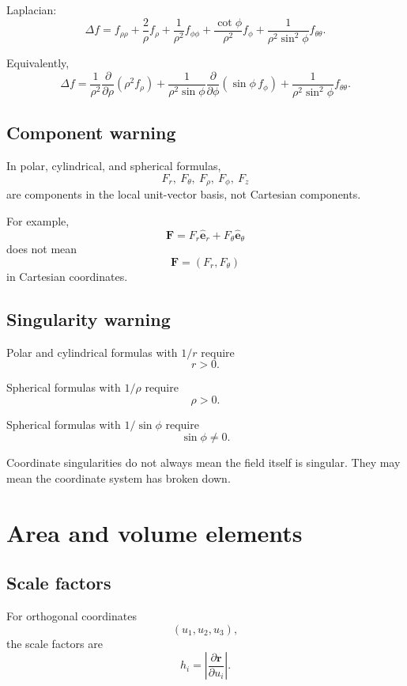 Laplacian:
\[
\boxed{
    \Delta f
    =
    f_{\rho\rho}
    +
    \frac2\rho f_\rho
    +
    \frac1{\rho^2}f_{\phi\phi}
    +
    \frac{\cot\phi}{\rho^2}f_\phi
    +
    \frac1{\rho^2\sin^2\phi}f_{\theta\theta}.
}
\]

Equivalently,
\[
\boxed{
    \Delta f
    =
    \frac1{\rho^2}\frac{\partial}{\partial\rho}
    \left(\rho^2 f_\rho\right)
    +
    \frac1{\rho^2\sin\phi}
    \frac{\partial}{\partial\phi}
    \left(\sin\phi\,f_\phi\right)
    +
    \frac1{\rho^2\sin^2\phi}f_{\theta\theta}.
}
\]

\subsection*{Component warning}

In polar, cylindrical, and spherical formulas,
\[
    F_r,\ F_\theta,\ F_\rho,\ F_\phi,\ F_z
\]
are components in the local unit-vector basis, not Cartesian components.

For example,
\[
    \mathbf F=F_r\widehat{\mathbf e}_r+F_\theta\widehat{\mathbf e}_\theta
\]
does not mean
\[
    \mathbf F=(F_r,F_\theta)
\]
in Cartesian coordinates.

\subsection*{Singularity warning}

Polar and cylindrical formulas with \(1/r\) require
\[
    r>0.
\]

Spherical formulas with \(1/\rho\) require
\[
    \rho>0.
\]

Spherical formulas with \(1/\sin\phi\) require
\[
    \sin\phi\ne0.
\]

Coordinate singularities do not always mean the field itself is singular.  They may mean
the coordinate system has broken down.

\section{Area and volume elements}
\label{app:D.5}

\subsection*{Scale factors}

For orthogonal coordinates
\[
    (u_1,u_2,u_3),
\]
the scale factors are
\[
\boxed{
    h_i=\left|\frac{\partial\mathbf r}{\partial u_i}\right|.
}
\]

